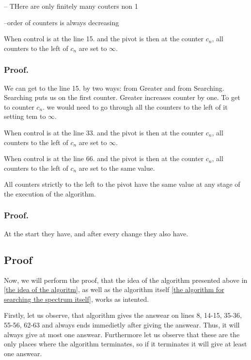 -- THere are only finitely many couters non 1

--order of counters is always decreasing

\begin{lemma}\label{Greater infinities to the left lemma}
When control is at the line 15. and the pivot is then at the counter $c_n$, all counters 
to the left of $c_n$ are set to $\infty$. 
\end{lemma}
\subsubsection{Proof.}
We can get to the line 15. by two ways: from Greater and from Searching. 
Searching puts us on the first counter. 
Greater increases counter by one. 
To get to counter $c_n$. we would need to go through all the counters to the left of it 
setting tem to $\infty$. 
\begin{lemma}\label{Searching infinities to the left lemma}
When control is at the line 33. and the pivot is then at the counter $c_n$, all counters 
to the left of $c_n$ are set to $\infty$. 
\end{lemma}

\begin{lemma}\label{Searching infinities to the left lemma}
When control is at the line 66. and the pivot is then at the counter $c_n$, all counters 
to the left of $c_n$ are set to the same value. 
\end{lemma}

\begin{lemma}
All counters strictly to the left to the pivot have the same value at any stage of 
the execution of the algorithm.
\end{lemma}
\subsubsection{Proof.}
At the start they have, and after every change they also have.
\subsection{Proof}
Now, we will perform the proof, that the idea of the algorithm presented above in 
\ref{the idea of the algoritm}, as 
well as the algorithm itself \ref{the algorithm for searching the spectrum itself}, 
works as intented.

Firstly, let us observe, that algorithm gives the answear on lines 8, 14-15, 35-36, 55-56, 
62-63 and 
always ends immedietly after giving the answear. Thus, it will always give at most one answear.
Furthermore let us observe that these are the only places where the algorithm terminates, 
so if it terminates it will give at least one answear.
 
